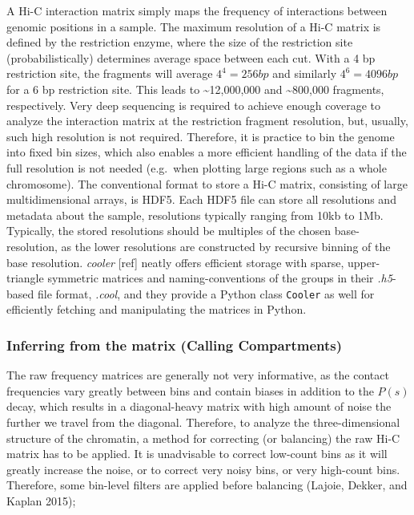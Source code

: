 \documentclass[
  11pt,
  a4paper,
]{scrbook}
\let\oldemph\emph
\renewcommand\emph[1]{\oldemph{\color{gray}#1}}
\begin{document}
A Hi-C interaction matrix simply maps the frequency of interactions
between genomic positions in a sample. The maximum resolution of a Hi-C
matrix is defined by the restriction enzyme, where the size of the
restriction site (probabilistically) determines average space between
each cut. With a 4 bp restriction site, the fragments will average
\(4^4 = 256 bp\) and similarly \(4^6 = 4096 bp\) for a 6 bp restriction
site. This leads to \textasciitilde12,000,000 and \textasciitilde800,000
fragments, respectively. Very deep sequencing is required to achieve
enough coverage to analyze the interaction matrix at the restriction
fragment resolution, but, usually, such high resolution is not required.
Therefore, it is practice to bin the genome into fixed bin sizes, which
also enables a more efficient handling of the data if the full
resolution is not needed (e.g.~when plotting large regions such as a
whole chromosome). The conventional format to store a Hi-C matrix,
consisting of large multidimensional arrays, is HDF5. Each HDF5 file can
store all resolutions and metadata about the sample, resolutions
typically ranging from 10kb to 1Mb. Typically, the stored resolutions
should be multiples of the chosen base-resolution, as the lower
resolutions are constructed by recursive binning of the base resolution.
\emph{cooler} {[}ref{]} neatly offers efficient storage with sparse,
upper-triangle symmetric matrices and naming-conventions of the groups
in their \emph{.h5}-based file format, \emph{.cool}, and they provide a
Python class \texttt{Cooler} as well for efficiently fetching and
manipulating the matrices in Python.

\subsubsection{Inferring from the matrix (Calling
Compartments)}\label{inferring-from-the-matrix-calling-compartments}

The raw frequency matrices are generally not very informative, as the
contact frequencies vary greatly between bins and contain biases in
addition to the \(P(s)\) decay, which results in a diagonal-heavy matrix
with high amount of noise the further we travel from the diagonal.
Therefore, to analyze the three-dimensional structure of the chromatin,
a method for correcting (or balancing) the raw Hi-C matrix has to be
applied. It is unadvisable to correct low-count bins as it will greatly
increase the noise, or to correct very noisy bins, or very high-count
bins. Therefore, some bin-level filters are applied before balancing
(Lajoie, Dekker, and Kaplan 2015);
\end{document}
